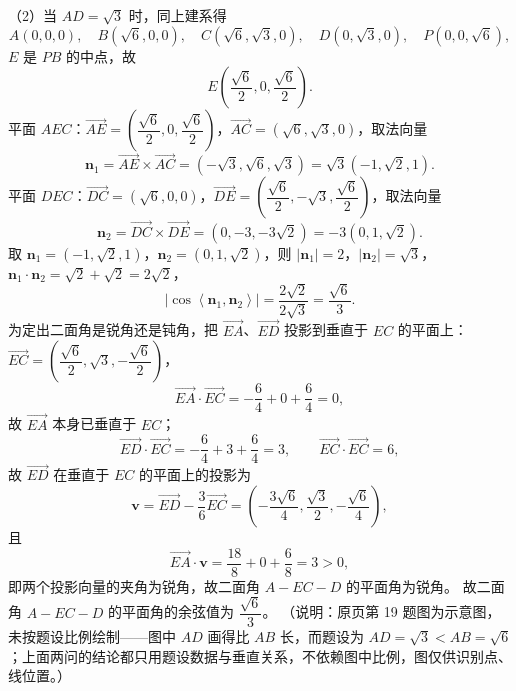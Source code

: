 \begin{answer}
（2）当 $AD=\sqrt3$ 时，同上建系得
\nopagebreak[4]
\[A(0,0,0),\quad B(\sqrt6,0,0),\quad C(\sqrt6,\sqrt3,0),\quad D(0,\sqrt3,0),\quad P(0,0,\sqrt6),\]
$E$ 是 $PB$ 的中点，故
\nopagebreak[4]
\[E\left(\frac{\sqrt6}{2},0,\frac{\sqrt6}{2}\right).\]
平面 $AEC$：$\overrightarrow{AE}=\left(\dfrac{\sqrt6}{2},0,\dfrac{\sqrt6}{2}\right)$，$\overrightarrow{AC}=\left(\sqrt6,\sqrt3,0\right)$，取法向量
\nopagebreak[4]
\[\boldsymbol n_1=\overrightarrow{AE}\times\overrightarrow{AC}=\left(-\sqrt3,\sqrt6,\sqrt3\right)=\sqrt3\left(-1,\sqrt2,1\right).\]
平面 $DEC$：$\overrightarrow{DC}=\left(\sqrt6,0,0\right)$，$\overrightarrow{DE}=\left(\dfrac{\sqrt6}{2},-\sqrt3,\dfrac{\sqrt6}{2}\right)$，取法向量
\nopagebreak[4]
\[\boldsymbol n_2=\overrightarrow{DC}\times\overrightarrow{DE}=\left(0,-3,-3\sqrt2\right)=-3\left(0,1,\sqrt2\right).\]
取 $\boldsymbol n_1=\left(-1,\sqrt2,1\right)$，$\boldsymbol n_2=\left(0,1,\sqrt2\right)$，则 $\left|\boldsymbol n_1\right|=2$，$\left|\boldsymbol n_2\right|=\sqrt3$，$\boldsymbol n_1\cdot\boldsymbol n_2=\sqrt2+\sqrt2=2\sqrt2$，
\nopagebreak[4]
\[\left|\cos\left\langle\boldsymbol n_1,\boldsymbol n_2\right\rangle\right|=\frac{2\sqrt2}{2\sqrt3}=\frac{\sqrt6}{3}.\]
为定出二面角是锐角还是钝角，把 $\overrightarrow{EA}$、$\overrightarrow{ED}$ 投影到垂直于 $EC$ 的平面上：$\overrightarrow{EC}=\left(\dfrac{\sqrt6}{2},\sqrt3,-\dfrac{\sqrt6}{2}\right)$，
\nopagebreak[4]
\[\overrightarrow{EA}\cdot\overrightarrow{EC}=-\frac64+0+\frac64=0,\]
故 $\overrightarrow{EA}$ 本身已垂直于 $EC$；
\nopagebreak[4]
\[\overrightarrow{ED}\cdot\overrightarrow{EC}=-\frac64+3+\frac64=3,\qquad \overrightarrow{EC}\cdot\overrightarrow{EC}=6,\]
故 $\overrightarrow{ED}$ 在垂直于 $EC$ 的平面上的投影为
\nopagebreak[4]
\[\boldsymbol v=\overrightarrow{ED}-\frac{3}{6}\overrightarrow{EC}=\left(-\frac{3\sqrt6}{4},\frac{\sqrt3}{2},-\frac{\sqrt6}{4}\right),\]
且
\nopagebreak[4]
\[\overrightarrow{EA}\cdot\boldsymbol v=\frac{18}{8}+0+\frac{6}{8}=3>0,\]
即两个投影向量的夹角为锐角，故二面角 $A-EC-D$ 的平面角为锐角。
故二面角 $A-EC-D$ 的平面角的余弦值为 $\dfrac{\sqrt6}{3}$。
（说明：原页第 19 题图为示意图，未按题设比例绘制——图中 $AD$ 画得比 $AB$ 长，而题设为 $AD=\sqrt3<AB=\sqrt6$；上面两问的结论都只用题设数据与垂直关系，不依赖图中比例，图仅供识别点、线位置。）


\end{answer}
